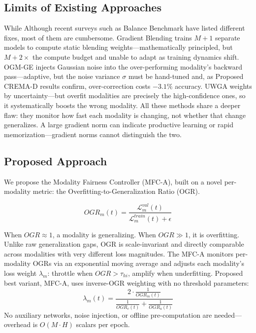 \documentclass[fleqn,10pt]{wlscirep}
\begin{document}
\subsection*{Limits of Existing Approaches}
While Although recent surveys such as Balance Benchmark \cite{xu2025balancebenchmark} have listed different fixes, most of them are cumbersome. Gradient Blending \cite{wang2020makes} trains $M{+}1$ separate models to compute static blending weights---mathematically principled, but $M{+}2\times$ the compute budget and unable to adapt as training dynamics shift. OGM-GE \cite{peng2022balanced} injects Gaussian noise into the over-performing modality's backward pass---adaptive, but the noise variance $\sigma$ must be hand-tuned and, as Proposed CREMA-D results confirm, over-correction costs $-3.1\%$ accuracy. UWGA \cite{kendall2018multi} weights by uncertainty---but overfit modalities are precisely the high-confidence ones, so it systematically boosts the wrong modality. All these methods share a deeper flaw: they monitor how fast each modality is changing, not whether that change generalizes. A large gradient norm can indicate productive learning or rapid memorization---gradient norms cannot distinguish the two.

\subsection*{Proposed Approach}
We propose the Modality Fairness Controller (MFC-A), built on a novel per-modality metric: the Overfitting-to-Generalization Ratio (OGR).

\begin{equation}
    OGR_m(t) = \frac{\mathcal{L}^{val}_m(t)}{\mathcal{L}^{train}_m(t) + \epsilon}
\end{equation}

When $OGR \approx 1$, a modality is generalizing. When $OGR \gg 1$, it is overfitting. Unlike raw generalization gaps, OGR is scale-invariant and directly comparable across modalities with very different loss magnitudes. The MFC-A monitors per-modality OGRs via an exponential moving average and adjusts each modality's loss weight $\lambda_m$: throttle when $OGR > \tau_{hi}$, amplify when underfitting.
Proposed best variant, MFC-A, uses inverse-OGR weighting with no threshold parameters:
\begin{equation}
      \lambda_m(t) = \frac{2 \cdot \frac{1}{OGR_m(t)}}{\frac{1}{OGR_v(t)} + \frac{1}{OGR_a(t)}}
  \end{equation}
No auxiliary networks, noise injection, or offline pre-computation are needed---overhead is $O(M \cdot H)$ scalars per epoch.
\end{document}
